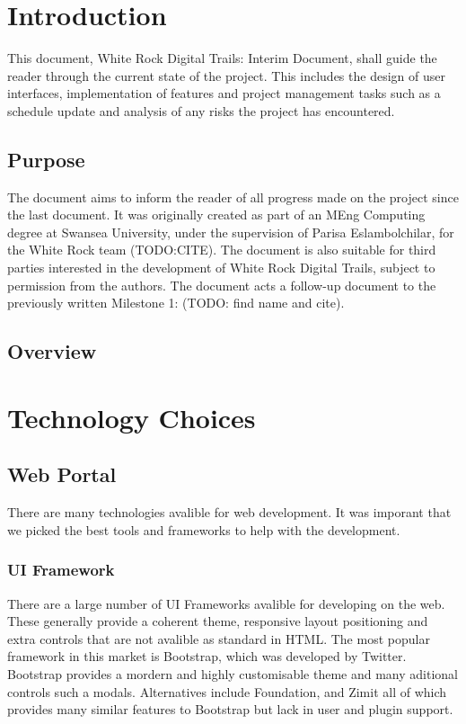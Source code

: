 \documentclass[11pt,a4paper]{article}
\begin{document}


\newpage 
\setcounter{page}{1}
\tableofcontents

\newpage
\setcounter{page}{1}
\section{Introduction}
This document, White Rock Digital Trails: Interim Document, shall guide the reader through the current state of the project. This includes the design of user interfaces, implementation of features and project management tasks such as a schedule update and analysis of any risks the project has encountered.
\subsection{Purpose}
The document aims to inform the reader of all progress made on the project since the last document. It was originally created as part of an MEng Computing degree at Swansea University, under the supervision of Parisa Eslambolchilar, for the White Rock team (TODO:CITE). The document is also suitable for third parties interested in the development of White Rock Digital Trails, subject to permission from the authors. The document acts a follow-up document to the previously written Milestone 1: (TODO: find name and cite).
\subsection{Overview}

\section{Technology Choices}
\subsection{Web Portal}
There are many technologies avalible for web development. It was imporant that we picked the best tools and frameworks to help with the development. 

\subsubsection{UI Framework}
There are a large number of UI Frameworks avalible for developing on the web. These generally provide a coherent theme, responsive layout positioning and extra controls that are not avalible as standard in HTML. The most popular framework in this market is Bootstrap\cite{bootstrap}, which was developed by Twitter. Bootstrap provides a mordern and highly customisable theme and many aditional controls such a modals. Alternatives include Foundation\cite{foundation}, and Zimit\cite{zimit} all of which provides many similar features to Bootstrap but lack in user and plugin support. 
\end{document}
